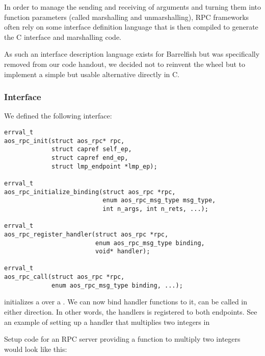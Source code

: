 In order to manage the sending and receiving of arguments and turning them into function parameters
(called marshalling and unmarshalling), RPC frameworks often rely on some interface definition language that
is then compiled to generate the C interface and marshalling code.

As such an interface description language exists for Barrelfish but was specifically removed from our code
handout, we decided not to reinvent the wheel but to implement a simple but usable alternative directly in C.

\subsubsection{Interface}
We defined the following interface:

\begin{mdframed}[style=myframe]
\begin{verbatim}
errval_t
aos_rpc_init(struct aos_rpc* rpc,
             struct capref self_ep,
             struct capref end_ep,
             struct lmp_endpoint *lmp_ep);
                      
errval_t
aos_rpc_initialize_binding(struct aos_rpc *rpc,
                           enum aos_rpc_msg_type msg_type,
                           int n_args, int n_rets, ...);

errval_t
aos_rpc_register_handler(struct aos_rpc *rpc,
                         enum aos_rpc_msg_type binding,
                         void* handler);

errval_t
aos_rpc_call(struct aos_rpc *rpc,
             enum aos_rpc_msg_type binding, ...);

\end{verbatim}
\end{mdframed}
 initializes a  over a . We can now bind handler functions
to it, can be called in either direction. In other words, the handlers is registered to both endpoints. See an example of setting up a handler that multiplies two integers in 

Setup code for an RPC server providing a function to multiply two integers would look like this:


